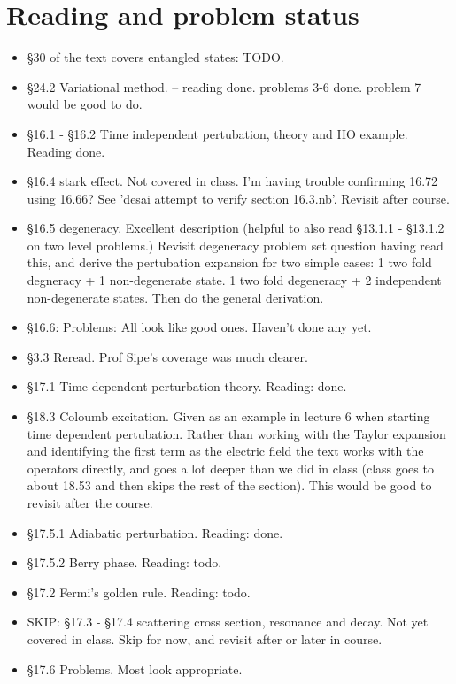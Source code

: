 \chapter{Reading and problem status}

\begin{itemize}
\item \S 30 of the text \cite{desai2009quantum} covers entangled states: TODO.
\item \S 24.2 Variational method.  -- reading done.  problems 3-6 done.  problem 7 would be good to do.
\item \S 16.1 - \S 16.2 Time independent pertubation, theory and HO example.  Reading done.
\item \S 16.4 stark effect.  Not covered in class.  I'm having trouble confirming 16.72 using 16.66?  See 'desai attempt to verify section 16.3.nb'.  Revisit after course.
\item \S 16.5 degeneracy.  Excellent description (helpful to also read \S 13.1.1 - \S 13.1.2 on two level problems.)  Revisit degeneracy problem set question having read this, and derive the pertubation expansion for two simple cases: 1 two fold degneracy + 1 non-degenerate state.  1 two fold degeneracy + 2 independent non-degenerate states.  Then do the general derivation.
\item \S 16.6: Problems: All look like good ones.  Haven't done any yet.
\item \S 3.3 Reread.  Prof Sipe's coverage was much clearer.
\item \S 17.1 Time dependent perturbation theory.  Reading: done.
\item \S 18.3 Coloumb excitation.  Given as an example in lecture 6 when starting time dependent pertubation.  Rather than working with the Taylor expansion and identifying the first term as the electric field the text works with the operators directly, and goes a lot deeper than we did in class (class goes to about 18.53 and then skips the rest of the section).  This would be good to revisit after the course.
\item \S 17.5.1 Adiabatic perturbation.  Reading: done.
\item \S 17.5.2 Berry phase. Reading: todo.
\item \S 17.2 Fermi's golden rule. Reading: todo.
\item SKIP: \S 17.3 - \S 17.4 scattering cross section, resonance and decay.  Not yet covered in class.  Skip for now, and revisit after or later in course.
\item \S 17.6 Problems.  Most look appropriate.

\end{itemize}
